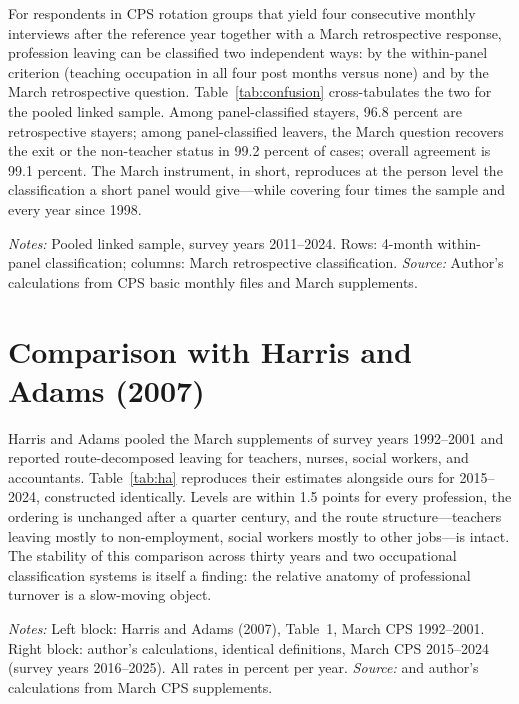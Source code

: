 \documentclass[11pt,a4paper]{article}
\newcommand{\fignote}[1]{\par\vspace{4pt}%
  \begin{minipage}{\linewidth}\footnotesize\color{ecgray}#1\end{minipage}}
\begin{document}
For respondents in CPS rotation groups that yield four consecutive
monthly interviews after the reference year together with a March
retrospective response, profession leaving can be classified two
independent ways: by the within-panel criterion (teaching occupation in
all four post months versus none) and by the March retrospective
question. Table~\ref{tab:confusion} cross-tabulates the two for the
pooled linked sample. Among panel-classified stayers, 96.8 percent are
retrospective stayers; among panel-classified leavers, the March
question recovers the exit or the non-teacher status in 99.2 percent
of cases; overall agreement is 99.1 percent. The March instrument, in
short, reproduces at the person level the classification a
short panel would give---while covering four times the sample and
every year since 1998.

\begin{table}[h]
\centering\small
\caption{March Retrospective versus Linked-Panel Classification}
\label{tab:confusion}

\fignote{\textit{Notes:} Pooled linked sample, survey years
2011--2024. Rows: 4-month within-panel classification; columns: March
retrospective classification. \textit{Source:} Author's calculations
from CPS basic monthly files and March supplements.}
\end{table}

\section{Comparison with Harris and Adams (2007)}\label{app:harris}

Harris and Adams pooled the March supplements of survey years
1992--2001 and reported route-decomposed leaving for teachers, nurses,
social workers, and accountants. Table~\ref{tab:ha} reproduces their
estimates alongside ours for 2015--2024, constructed identically.
Levels are within 1.5 points for every profession, the ordering is
unchanged after a quarter century, and the route structure---teachers
leaving mostly to non-employment, social workers mostly to other
jobs---is intact. The stability of this comparison across thirty years
and two occupational classification systems is itself a finding: the
relative anatomy of professional turnover is a slow-moving object.

\begin{table}[h]
\centering\small
\caption{Leaving Rates and Routes: 1992--2001 versus 2015--2024}
\label{tab:ha}

\fignote{\textit{Notes:} Left block: Harris and Adams (2007),
Table~1, March CPS 1992--2001. Right block: author's calculations,
identical definitions, March CPS 2015--2024 (survey years 2016--2025).
All rates in percent per year. \textit{Source:} \citet{harris2007} and
author's calculations from March CPS supplements.}
\end{table}
\end{document}
